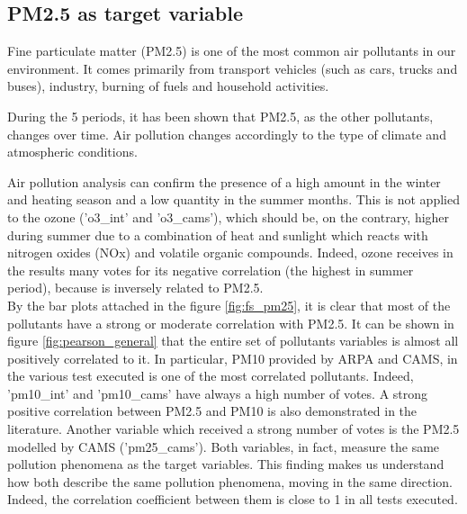 \subsection{PM2.5 as target variable}
Fine particulate matter (PM2.5) is one of the most common air pollutants in our environment. 
It comes primarily from transport vehicles (such as cars, trucks and buses), industry, burning of fuels and household activities.\\ \par
During the 5 periods, it has been shown that PM2.5, as the other pollutants, changes over time. Air pollution changes accordingly to the type of climate and atmospheric conditions.\\

Air pollution analysis can confirm the presence of a high amount in the winter and heating season and a low quantity in the summer months\cite{cichowicz2017dispersion}. This is not applied to the ozone ('o3\_int' and 'o3\_cams'), which should be, on the contrary, higher during summer due to a combination of heat and sunlight which reacts with nitrogen oxides (NOx) and volatile organic compounds. Indeed, ozone receives in the results many votes for its negative correlation (the highest in summer period), because is inversely related to PM2.5.\\
By the bar plots attached in the figure \ref{fig:fs_pm25}, it is clear that most of the pollutants have a strong or moderate correlation with PM2.5. 
It can be shown in figure \ref{fig:pearson_general} that the entire set of pollutants variables is almost all positively correlated to it.
In particular, PM10 provided by ARPA and CAMS, in the various test executed is one of the most correlated pollutants. Indeed, 'pm10\_int' and 'pm10\_cams' have always a high number of votes. A strong positive correlation between PM2.5 and PM10 is also demonstrated in the literature\cite{zhou2016concentrations}.
Another variable which received a strong number of votes is the PM2.5 modelled by CAMS ('pm25\_cams'). 
Both variables, in fact, measure the same pollution phenomena as the target variables. This finding makes us understand how both describe the same pollution phenomena, moving in the same direction. Indeed, the correlation coefficient between them is close to 1 in all tests executed.
